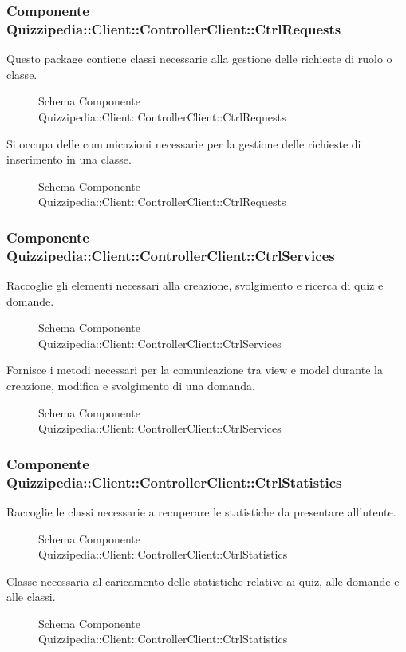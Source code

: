 \subsubsection{Componente Quizzipedia::Client::ControllerClient::CtrlRequests}
Questo package contiene classi necessarie alla gestione delle richieste di ruolo o classe.
\begin{figure}[H]
\centering
\noindent{}
\caption{Schema Componente Quizzipedia::Client::ControllerClient::CtrlRequests}
\end{figure}
Si occupa delle comunicazioni necessarie per la gestione delle richieste di inserimento in una classe.
\begin{figure}[H]
\centering
\noindent{}
\caption{Schema Componente Quizzipedia::Client::ControllerClient::CtrlRequests}
\end{figure}
\subsubsection{Componente Quizzipedia::Client::ControllerClient::CtrlServices}
Raccoglie gli elementi necessari alla creazione, svolgimento e ricerca di quiz e domande.
\begin{figure}[H]
\centering
\noindent{}
\caption{Schema Componente Quizzipedia::Client::ControllerClient::CtrlServices}
\end{figure}
Fornisce i metodi necessari per la comunicazione tra view e model durante la creazione, modifica e svolgimento di una domanda.
\begin{figure}[H]
\centering
\noindent{}
\caption{Schema Componente Quizzipedia::Client::ControllerClient::CtrlServices}
\end{figure}
\subsubsection{Componente Quizzipedia::Client::ControllerClient::CtrlStatistics}
Raccoglie le classi necessarie a recuperare le statistiche da presentare all'utente.
\begin{figure}[H]
\centering
\noindent{}
\caption{Schema Componente Quizzipedia::Client::ControllerClient::CtrlStatistics}
\end{figure}
Classe necessaria al caricamento delle statistiche relative ai quiz, alle domande e alle classi.
\begin{figure}[H]
\centering
\noindent{}
\caption{Schema Componente Quizzipedia::Client::ControllerClient::CtrlStatistics}
\end{figure}
